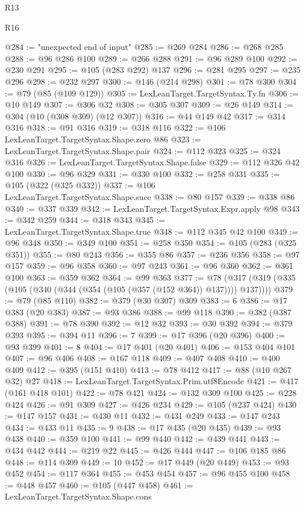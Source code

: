 \begin{lexlean}{R13}
\begin{lexlean}{R16}
\begin{coremodule}
{{{{{{{{{{{{{{{{{{{{{{{{{{{{{{{{{{{{{{{{{{{{{{{{{{{{{{{{{{{{{{{{{{{{{{{{{{{{{{{{{{{{{{{{{{{{{{{{{{{{{{{{{{{{{{{{{@284 := "unexpected end of input"
@285 := @269 @284
@286 := @268 @285
@288 := @96 @286 @100
@289 := @266 @288
@291 := @96 @289 @100
@292 := @230 @291
@295 := @105 (@283 @292) @137
@296 := @281 @295
@297 := @235 @296
@298 := @232 @297
@300 := @146 (@214 @298)
@301 := @78 @300
@304 := @79 (@85 (@109 @129))
@305 := LexLeanTarget.TargetSyntax.Ty.fn
@306 := @10 @149
@307 := @306 @32
@308 := @305 @307
@309 := @26 @149
@314 := @304 (@10 (@308 @309) (@12 @307))
@316 := @44 @149 @42
@317 := @314 @316
@318 := @91 @316
@319 := @318 @116
@322 := @106 LexLeanTarget.TargetSyntax.Shape.zero @86
@323 := LexLeanTarget.TargetSyntax.Shape.pair
@324 := @112 @323
@325 := @324 @316
@326 := LexLeanTarget.TargetSyntax.Shape.false
@329 := @112 @326 @42 @100
@330 := @96 @329
@331 := @330 @100
@332 := @258 @331
@335 := @105 (@322 (@325 @332))
@337 := @106 LexLeanTarget.TargetSyntax.Shape.succ
@338 := @80 @157
@339 := @338 @86
@340 := @337 @339
@342 := LexLeanTarget.TargetSyntax.Expr.apply @98
@343 := @342 @259
@344 := @318 @343
@345 := LexLeanTarget.TargetSyntax.Shape.true
@348 := @112 @345 @42 @100
@349 := @96 @348
@350 := @349 @100
@351 := @258 @350
@354 := @105 (@283 (@325 @351))
@355 := @80 @243
@356 := @355 @86
@357 := @236 @356
@358 := @97 @157
@359 := @96 @358
@360 := @97 @243
@361 := @96 @360
@362 := @361 @100
@363 := @359 @362
@364 := @99 @363
@377 := @78 (@317 (@319 (@335 (@105 (@340 (@344 (@354 (@105 (@357 (@152 @364)) @137)))) @137))))
@379 := @79 (@85 @110)
@382 := @379 (@30 @307) @309
@383 := 6
@386 := @17 @383 (@20 @383)
@387 := @93 @386
@388 := @99 @118
@390 := @382 (@387 @388)
@391 := @78 @390
@392 := @12 @32
@393 := @30 @392
@394 := @379 @393
@395 := @394 @11
@396 := 7
@399 := @17 @396 (@20 @396)
@400 := @93 @399
@401 := 8
@404 := @17 @401 (@20 @401)
@406 := @153 @404 @101
@407 := @96 @406
@408 := @167 @118
@409 := @407 @408
@410 := @400 @409
@412 := @395 (@151 @410)
@413 := @78 @412
@417 := @88 (@10 @267 @32) @27
@418 := LexLeanTarget.TargetSyntax.Prim.utf8Encode
@421 := @417 (@161 @418 @101)
@422 := @78 @421
@424 := @132 @309 @100
@425 := @228 @424
@426 := @91 @309
@427 := @426 @234
@429 := @105 (@237 @424)
@430 := @147 @157
@431 := @430 @11
@432 := @431 @249
@433 := @147 @243
@434 := @433 @11
@435 := 9
@438 := @17 @435 (@20 @435)
@439 := @93 @438
@440 := @359 @100
@441 := @99 @440
@442 := @439 @441
@443 := @434 @442
@444 := @219 @22
@445 := @426 @444
@447 := @106 @185 @86
@448 := @114 @309
@449 := 10
@452 := @17 @449 (@20 @449)
@453 := @93 @452
@454 := @117 @364
@455 := @453 @454
@457 := @96 @455 @100
@458 := @448 @457
@460 := @105 (@447 @458)
@461 := LexLeanTarget.TargetSyntax.Shape.cons
}}}}}}}}}}}}}}}}}}}}}}}}}}}}}}}}}}}}}}}}}}}}}}}}}}}}}}}}}}}}}}}}}}}}}}}}}}}}}}}}}}}}}}}}}}}}}}}}}}}}}}}}}}}}}}}}}
\end{coremodule}
\end{lexlean}
\end{lexlean}
